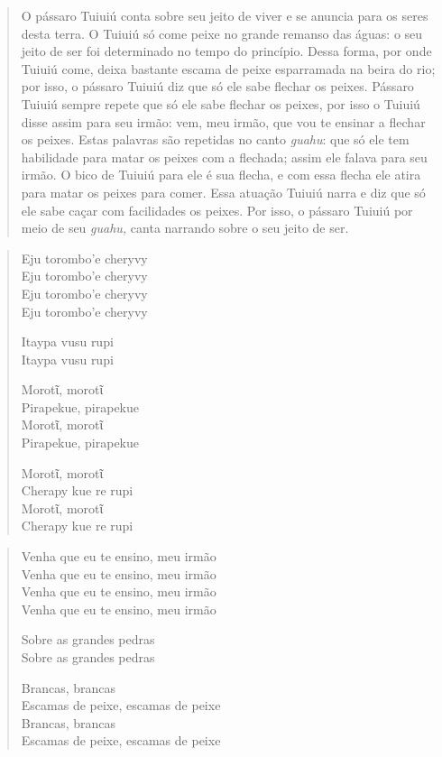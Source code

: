 \begin{itemize}
\begin{quote}
O pássaro Tuiuiú conta sobre seu jeito de viver e se anuncia para os
seres desta terra. O Tuiuiú só come peixe no grande remanso das águas: o
seu jeito de ser foi determinado no tempo do princípio. Dessa forma, por
onde Tuiuiú come, deixa bastante escama de peixe esparramada na beira do
rio; por isso, o pássaro Tuiuiú diz que só ele sabe flechar os peixes.
Pássaro Tuiuiú sempre repete que só ele sabe flechar os peixes, por isso
o Tuiuiú disse assim para seu irmão: vem, meu irmão, que vou te ensinar
a flechar os peixes. Estas palavras são repetidas no canto \emph{guahu}:
que só ele tem habilidade para matar os peixes com a flechada; assim ele
falava para seu irmão. O bico de Tuiuiú para ele é sua flecha, e com
essa flecha ele atira para matar os peixes para comer. Essa atuação
Tuiuiú narra e diz que só ele sabe caçar com facilidades os peixes. Por
isso, o pássaro Tuiuiú por meio de seu \emph{guahu,} canta narrando
sobre o seu jeito de ser.
\end{quote}

\begin{verse}
Eju torombo'e cheryvy\\
Eju torombo'e cheryvy\\
Eju torombo'e cheryvy\\
Eju torombo'e cheryvy

Itaypa vusu rupi\\
Itaypa vusu rupi

Morotῖ, morotῖ\\
Pirapekue, pirapekue\\
Morotῖ, morotῖ\\
Pirapekue, pirapekue

Morotῖ, morotῖ\\
Cherapy kue re rupi\\
Morotῖ, morotῖ\\
Cherapy kue re rupi
\end{verse}

\begin{verse}
Venha que eu te ensino, meu irmão\\
Venha que eu te ensino, meu irmão\\
Venha que eu te ensino, meu irmão\\
Venha que eu te ensino, meu irmão

Sobre as grandes pedras\\
Sobre as grandes pedras

Brancas, brancas\\
Escamas de peixe, escamas de peixe\\
Brancas, brancas\\
Escamas de peixe, escamas de peixe


\end{verse}
\end{itemize}
